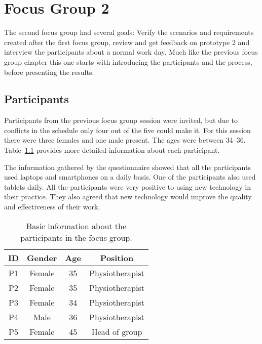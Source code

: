 \chapter{Focus Group 2}
\label{ch:focusGroup2}
The second focus group had several goals: Verify the scenarios and requirements created after the first focus group, review and get feedback on prototype 2 and interview the participants about a normal work day. Much like the previous focus group chapter this one starts with introducing the participants and the process, before presenting the results.

\section{Participants}
\label{sec:participants}
Participants from the previous focus group session were invited, but due to conflicts in the schedule only four out of the five could make it. For this session there were three females and one male present. The ages were between 34--36. Table~\ref{tab:participants} provides more detailed information about each participant.

The information gathered by the questionnaire showed that all the participants used laptops and smartphones on a daily basis. One of the participants also used tablets daily. All the participants were very positive to using new technology in their practice. They also agreed that new technology would improve the quality and effectiveness of their work.

\begin{table}[h!]
  \begin{center}
  \begin{tabular}{|c|c|c|c|}
    \hline
    \textbf{ID} & \textbf{Gender} & \textbf{Age} & \textbf{Position} \\ \hline
    P1 & Female & 35 & Physiotherapist \\ \hline
    P2 & Female & 35 & Physiotherapist \\ \hline
    P3 & Female & 34 & Physiotherapist \\ \hline
    P4 & Male   & 36 & Physiotherapist \\ \hline
    P5 & Female & 45 & Head of group   \\ \hline
  \end{tabular}
  \end{center}
  \caption[Participant information]{Basic information about the participants in the focus group.}
  \label{tab:participants}
\end{table}

